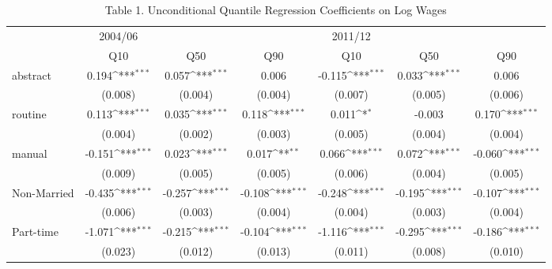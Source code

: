 \begin{table}[htbp]\centering
\def\sym#1{\ifmmode^{#1}\else\(^{#1}\)\fi}
\caption{Table 1. Unconditional Quantile Regression Coefficients on Log Wages}
\begin{tabular}{l*{6}{c}}
\hline\hline
                    &     2004/06         &                     &                     &     2011/12         &                     &                     \\
                    &\multicolumn{1}{c}{Q10}&\multicolumn{1}{c}{Q50}&\multicolumn{1}{c}{Q90}&\multicolumn{1}{c}{Q10}&\multicolumn{1}{c}{Q50}&\multicolumn{1}{c}{Q90}\\
\hline
abstract            &       0.194\sym{***}&       0.057\sym{***}&       0.006         &      -0.115\sym{***}&       0.033\sym{***}&       0.006         \\
                    &     (0.008)         &     (0.004)         &     (0.004)         &     (0.007)         &     (0.005)         &     (0.006)         \\
routine             &       0.113\sym{***}&       0.035\sym{***}&       0.118\sym{***}&       0.011\sym{*}  &      -0.003         &       0.170\sym{***}\\
                    &     (0.004)         &     (0.002)         &     (0.003)         &     (0.005)         &     (0.004)         &     (0.004)         \\
manual              &      -0.151\sym{***}&       0.023\sym{***}&       0.017\sym{**} &       0.066\sym{***}&       0.072\sym{***}&      -0.060\sym{***}\\
                    &     (0.009)         &     (0.005)         &     (0.005)         &     (0.006)         &     (0.004)         &     (0.005)         \\
Non-Married         &      -0.435\sym{***}&      -0.257\sym{***}&      -0.108\sym{***}&      -0.248\sym{***}&      -0.195\sym{***}&      -0.107\sym{***}\\
                    &     (0.006)         &     (0.003)         &     (0.004)         &     (0.004)         &     (0.003)         &     (0.004)         \\
Part-time           &      -1.071\sym{***}&      -0.215\sym{***}&      -0.104\sym{***}&      -1.116\sym{***}&      -0.295\sym{***}&      -0.186\sym{***}\\
                    &     (0.023)         &     (0.012)         &     (0.013)         &     (0.011)         &     (0.008)         &     (0.010)         \\

\end{tabular}
\end{table}
